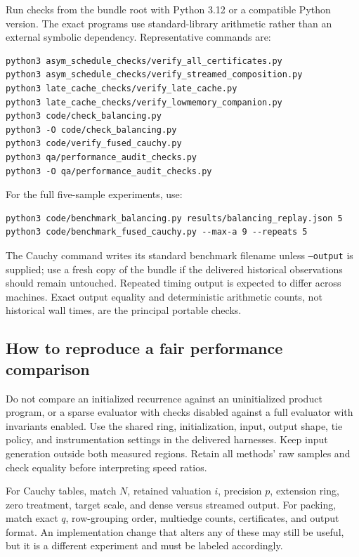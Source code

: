 \documentclass[11pt,letterpaper]{article}
\theoremstyle{remark}\newtheorem{remark}[theorem]{Remark}
\begin{document}
Run checks from the bundle root with Python 3.12 or a compatible Python version. The exact programs use standard-library arithmetic rather than an external symbolic dependency. Representative commands are:
\par\noindent\begin{minipage}{\linewidth}\small
\begin{verbatim}
python3 asym_schedule_checks/verify_all_certificates.py
python3 asym_schedule_checks/verify_streamed_composition.py
python3 late_cache_checks/verify_late_cache.py
python3 late_cache_checks/verify_lowmemory_companion.py
python3 code/check_balancing.py
python3 -O code/check_balancing.py
python3 code/verify_fused_cauchy.py
python3 qa/performance_audit_checks.py
python3 -O qa/performance_audit_checks.py
\end{verbatim}
\end{minipage}\par
For the full five-sample experiments, use:
\begin{verbatim}
python3 code/benchmark_balancing.py results/balancing_replay.json 5
python3 code/benchmark_fused_cauchy.py --max-a 9 --repeats 5
\end{verbatim}
The Cauchy command writes its standard benchmark filename unless \texttt{--output} is supplied; use a fresh copy of the bundle if the delivered historical observations should remain untouched. Repeated timing output is expected to differ across machines. Exact output equality and deterministic arithmetic counts, not historical wall times, are the principal portable checks.

\subsection{How to reproduce a fair performance comparison}
Do not compare an initialized recurrence against an uninitialized product program, or a sparse evaluator with checks disabled against a full evaluator with invariants enabled. Use the shared ring, initialization, input, output shape, tie policy, and instrumentation settings in the delivered harnesses. Keep input generation outside both measured regions. Retain all methods' raw samples and check equality before interpreting speed ratios.

For Cauchy tables, match $N$, retained valuation $i$, precision $p$, extension ring, zero treatment, target scale, and dense versus streamed output. For packing, match exact $q$, row-grouping order, multiedge counts, certificates, and output format. An implementation change that alters any of these may still be useful, but it is a different experiment and must be labeled accordingly.
\end{document}
